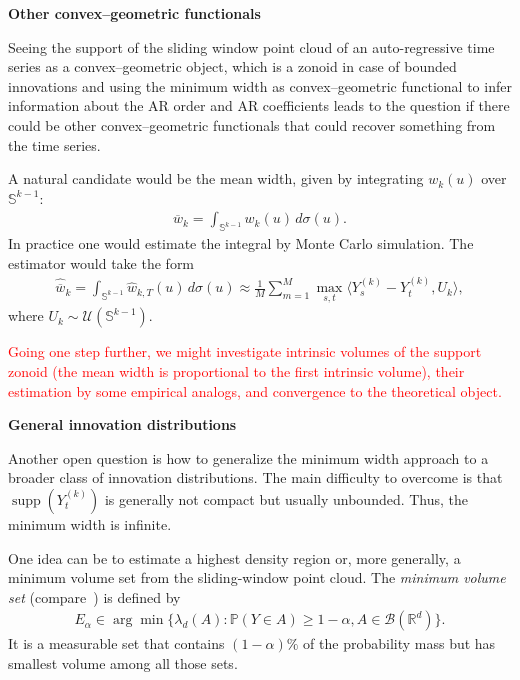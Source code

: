 
\textbf{Other convex--geometric functionals}

Seeing the support of the sliding window point cloud of an auto-regressive time series as a convex--geometric object, which is a zonoid in case of bounded innovations and using the minimum width as convex--geometric functional to infer information about the AR order and AR coefficients leads to the question if there could be other convex--geometric functionals that could recover something from the time series.

A natural candidate would be the mean width, given by integrating $w_k(u)$ over $\mathbb{S}^{k-1}$:
\begin{align*}
    \overline{w}_k=\int_{\mathbb{S}^{k-1}}w_k(u)\,d\sigma(u).
\end{align*}
In practice one would estimate the integral by Monte Carlo simulation. The estimator would take the form
\begin{align*}
    \hat{\overline{w}}_k=\int_{\mathbb{S}^{k-1}}\hat{w}_{k,T}(u)\,d\sigma(u)\approx\frac{1}{M}\sum_{m=1}^{M}\max_{s,t}\langle Y_s^{(k)}-Y_t^{(k)},U_k\rangle,
\end{align*}
where $U_k\sim\mathcal{U}(\mathbb{S}^{k-1})$.

\textcolor{red}{Going one step further, we might investigate intrinsic volumes of the support zonoid (the mean width is proportional to the first intrinsic volume), their estimation by some empirical analogs, and convergence to the theoretical object.}

\textbf{General innovation distributions}

Another open question is how to generalize the minimum width approach to a broader class of innovation distributions. The main difficulty to overcome is that $\operatorname{supp}(Y_t^{(k)})$ is generally not compact but usually unbounded. Thus, the minimum width is infinite.

One idea can be to estimate a highest density region or, more generally, a minimum volume set from the sliding-window point cloud. The \textit{minimum volume set} (compare~\cite{JMLR:v7:scott06a}) is defined by
\begin{align*}
    E_{\alpha}\in\arg\min\{\lambda_d(A):\mathbb{P}(Y\in A)\ge1-\alpha,A\in\mathcal{B}(\mathbb{R}^d)\}.
\end{align*}
It is a measurable set that contains $(1-\alpha)\%$ of the probability mass but has smallest volume among all those sets.


